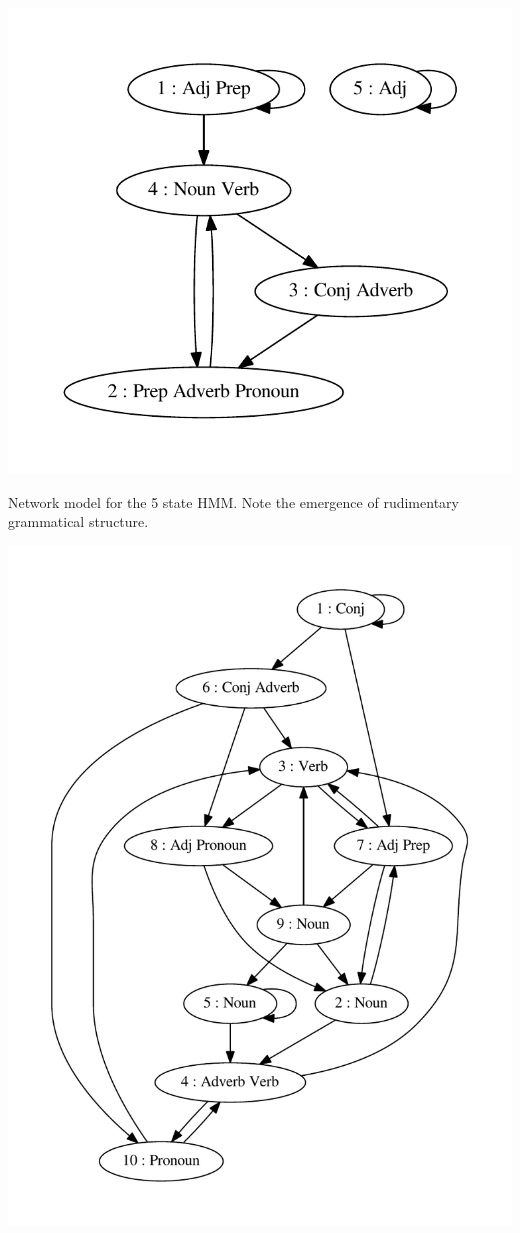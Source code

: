 \begin{center}
\includegraphics[scale=0.6]{../src/results/graph_5}
\end{center}

Network model for the 5 state HMM. Note the emergence of rudimentary grammatical structure.

\begin{center}
\includegraphics[scale=0.6]{../src/results/graph_10}
\end{center}

